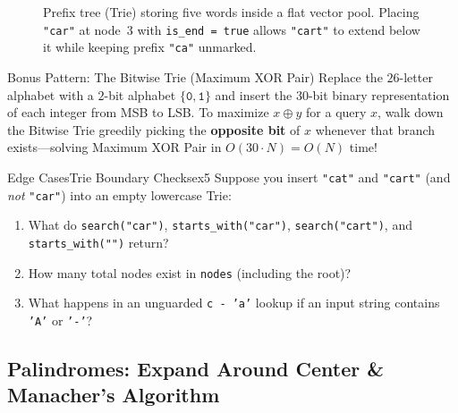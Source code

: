 \documentclass[11pt,a4paper]{article}
\theoremstyle{definition}
\begin{document}
\begin{figure}[htbp]
\caption{Prefix tree (Trie) storing five words inside a flat vector pool. Placing \texttt{"car"} at node~3 with \texttt{is\_end = true} allows \texttt{"cart"} to extend below it while keeping prefix \texttt{"ca"} unmarked.}
\label{fig:trie_vector_pool}
\end{figure}

\begin{calloutbox}{Bonus Pattern: The Bitwise Trie (Maximum XOR Pair)}
Replace the $26$-letter alphabet with a $2$-bit alphabet $\{\texttt{0}, \texttt{1}\}$ and insert the $30$-bit binary representation of each integer from MSB to LSB. To maximize $x \oplus y$ for a query $x$, walk down the Bitwise Trie greedily picking the \textbf{opposite bit} of $x$ whenever that branch exists---solving Maximum XOR Pair in $O(30 \cdot N) = O(N)$ time!
\end{calloutbox}

\begin{tryitbox}{Edge Cases}{Trie Boundary Checks}{ex5}
Suppose you insert \texttt{"cat"} and \texttt{"cart"} (and \emph{not} \texttt{"car"}) into an empty lowercase Trie:
\begin{enumerate}
    \item What do \texttt{search("car")}, \texttt{starts\_with("car")}, \texttt{search("cart")}, and \texttt{starts\_with("")} return?
    \item How many total nodes exist in \texttt{nodes} (including the root)?
    \item What happens in an unguarded \texttt{c - 'a'} lookup if an input string contains \texttt{'A'} or \texttt{'-'}?
\end{enumerate}
\end{tryitbox}

\subsection{Palindromes: Expand Around Center \& Manacher's Algorithm}
\end{document}
